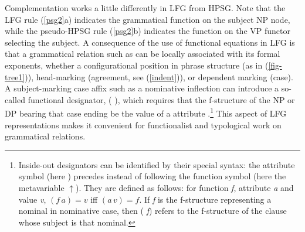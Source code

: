 Complementation works a little differently in LFG from HPSG.  Note that the LFG  rule (\ref{psg2}a) indicates the  grammatical function on the subject NP node, while the pseudo-HPSG rule (\ref{psg2}b) indicates the  function on the VP functor selecting the subject.   A consequence of the use of functional equations in LFG is that a grammatical relation such as  can be locally associated with its formal exponents, whether a configurational position in phrase structure (as in (\ref{fig-tree1})), head-marking (agreement, see (\ref{indent})), or dependent marking (case).  A subject-marking case affix such as a nominative inflection can introduce a so-called  functional designator, ( \Up),
 which requires that the f-structure of the NP or DP bearing that case ending be the value of a  attribute \citep{Nordlinger98a-u}.\footnote{Inside-out designators can be identified by their special syntax: the attribute symbol (here ) precedes instead of following the function symbol (here the metavariable $\uparrow$).  
They are defined as follows:  for function \textit{f}, attribute \textit{a} and value \textit{v}, $(f \, a) = v$ iff $(a \, v) = f$. If \textit{f} is the f-structure representing a nominal in nominative case, then ( \textit{f}) refers to the f-structure of the clause whose subject is that nominal.}  This aspect of LFG representations makes it convenient for functionalist and typological work on grammatical relations.  


 
